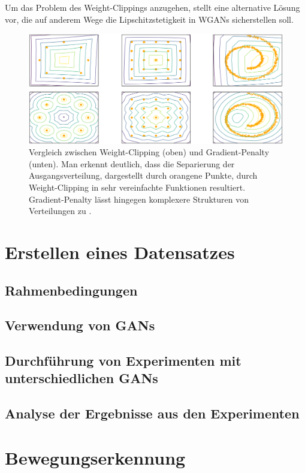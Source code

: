 \documentclass{hsflensburg}
\begin{document}
  Um das Problem des Weight-Clippings anzugehen, stellt
  \cite{gulrajani2017improved} eine alternative Lösung vor, die auf anderem Wege
  die Lipschitzstetigkeit in WGANs sicherstellen soll.

  \begin{figure}
    \centering
    \includegraphics[width=\textwidth]{images/problems_of_weight_clipping}
    \caption{Vergleich zwischen Weight-Clipping (oben) und Gradient-Penalty
    (unten). Man erkennt deutlich, dass die Separierung der Ausgangsverteilung,
    dargestellt durch orangene Punkte, durch Weight-Clipping in sehr
    vereinfachte Funktionen resultiert. Gradient-Penalty lässt hingegen
    komplexere Strukturen von Verteilungen zu \cite{gulrajani2017improved}.}
    \label{fig:problems-of-weight-clipping}
  \end{figure}

  \chapter{Erstellen eines Datensatzes}
  \section{Rahmenbedingungen}
  \section{Verwendung von GANs}
  \section{Durchführung von Experimenten mit unterschiedlichen GANs}
  \section{Analyse der Ergebnisse aus den Experimenten}

  \chapter{Bewegungserkennung}
\end{document}
